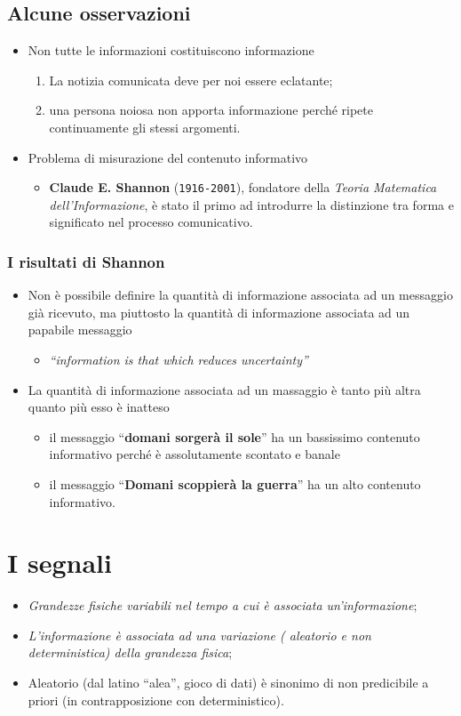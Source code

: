 \subsection{Alcune osservazioni}
\begin{itemize}
	\item Non tutte le informazioni costituiscono informazione
		\begin{enumerate}
			\item La notizia comunicata deve per noi essere eclatante;
			\item una persona noiosa non apporta informazione perché ripete
				continuamente gli stessi argomenti.
		\end{enumerate}
	\item Problema di misurazione del contenuto informativo
		\begin{itemize}
			\item {\bf Claude E. Shannon} ({\tt 1916-2001}), fondatore della
				\textit{Teoria Matematica dell'Informazione}, è stato il primo
				ad introdurre la distinzione tra forma e significato nel
				processo comunicativo.
		\end{itemize}
\end{itemize}
\subsubsection{I risultati di Shannon}
\begin{itemize}
	\item Non è possibile definire la quantità di informazione associata ad un
		messaggio già ricevuto, ma piuttosto la quantità di informazione
		associata ad un papabile messaggio
		\begin{itemize}
			\item \textit{``information is that which reduces uncertainty''}
		\end{itemize}
	\item La quantità di informazione associata ad un massaggio è tanto più
		altra quanto più esso è inatteso
		\begin{itemize}
			\item il messaggio ``{\bf domani sorgerà il sole}'' ha un bassissimo
				contenuto informativo perché è assolutamente scontato e banale
			\item il messaggio ``{\bf Domani scoppierà la guerra}'' ha un alto
				contenuto informativo.
		\end{itemize}
\end{itemize}
\section{I segnali}
\begin{itemize}
	\item \textit{Grandezze fisiche variabili nel tempo a cui è associata
		un'informazione};
	\item \textit{L'informazione è associata ad una variazione ({\color{red}
		aleatorio} e non deterministica) della grandezza fisica};
	\item Aleatorio (dal latino ``alea'', gioco di dati) è sinonimo di non
		predicibile a priori (in contrapposizione con deterministico).
\end{itemize}
